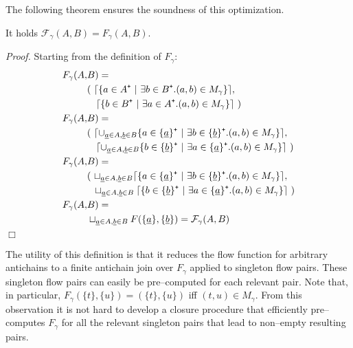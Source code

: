 \documentclass{sigplanconf}
\newcommand{\mc}[1]{\mathcal{#1}}
\newcommand{\mt}[1]{\text{\tt #1}}
\begin{document}
The following theorem ensures the soundness of this optimization.
\begin{samepage}
\begin{theorem}
It holds $\mc{F}_\gamma(A, B) = F_\gamma(A, B)$.
\end{theorem}
\emph{Proof.} Starting from the definition of $F_\gamma$:
\begin{align*}
F_\gamma( A, &B ) = \\ 
&(\ \lceil \{ a \in A^\mt{+}\ |\ \exists b \in B^\mt{+} . (a, b) \in
M_\gamma \} \rceil, \\
& \ \ \;\lceil \{ b \in B^\mt{+}\ |\ \exists a \in A^\mt{+} . (a, b)
\in M_\gamma \} \rceil\ ) \\
F_\gamma( A, &B ) = \\
&(\ \lceil \cup_{\underline{a} \in A, \underline{b} \in B} \{ a \in \{
\underline{a} \}^\mt{+}\ |\ \exists b \in \{ \underline{b} \}^\mt{+}
. (a, b) \in M_\gamma \} \rceil, \\
& \ \ \;\lceil \cup_{\underline{a} \in A, \underline{b} \in B} \{ b
\in \{ \underline{b} \}^\mt{+}\ |\ \exists a \in \{ \underline{a}
\}^\mt{+} . (a, b) \in M_\gamma \} \rceil\ ) \\
F_\gamma( A, &B ) = \\
&(\ \sqcup_{\underline{a} \in A, \underline{b} \in B} \lceil \{ a \in
\{ \underline{a} \}^\mt{+}\ |\ \exists b \in \{ \underline{b}
\}^\mt{+} . (a, b) \in M_\gamma \} \rceil, \\
& \ \;\sqcup_{\underline{a} \in A, \underline{b} \in B} \lceil \{ b
\in \{ \underline{b} \}^\mt{+}\ |\ \exists a \in \{ \underline{a}
\}^\mt{+} . (a, b) \in M_\gamma \} \rceil\ ) \\
F_\gamma(A, &B) = \\
& \sqcup_{\underline{a} \in A, \underline{b} \in B} F(\{ \underline{a}
\}, \{ \underline{b} \} ) = \mc{F}_\gamma(A, B)
\end{align*}
$\Box$
\end{samepage}

The utility of this definition is that it reduces the flow function
for arbitrary antichains to a finite antichain join over $F_\gamma$
applied to singleton flow pairs. These singleton flow pairs can easily
be pre--computed for each relevant pair. Note that, in particular,
$F_\gamma(\{ t \}, \{ u \}) = (\{ t \}, \{ u \})$ iff $(t, u) \in
M_\gamma$. From this observation it is not hard to develop a closure
procedure that efficiently pre--computes $F_\gamma$ for all the
relevant singleton pairs that lead to non--empty resulting pairs.
\end{document}
